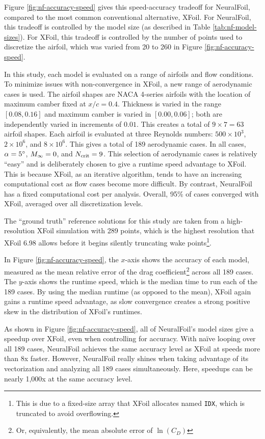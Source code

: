 Figure \ref{fig:nf-accuracy-speed} gives this speed-accuracy tradeoff for NeuralFoil, compared to the most common conventional alternative, XFoil. For NeuralFoil, this tradeoff is controlled by the model size (as described in Table \ref{tab:nf-model-sizes}). For XFoil, this tradeoff is controlled by the number of points used to discretize the airfoil, which was varied from 20 to 260 in Figure \ref{fig:nf-accuracy-speed}.

In this study, each model is evaluated on a range of airfoils and flow conditions. To minimize issues with non-convergence in XFoil, a new range of aerodynamic cases is used. The airfoil shapes are NACA 4-series airfoils with the location of maximum camber fixed at $x/c=0.4$. Thickness is varied in the range $[0.08, 0.16]$ and maximum camber is varied in $[0.00, 0.06]$; both are independently varied in increments of $0.01$. This creates a total of $9\times7=63$ airfoil shapes. Each airfoil is evaluated at three Reynolds numbers: $500\times10^3$, $2\times10^6$, and $8\times10^6$. This gives a total of 189 aerodynamic cases. In all cases, $\alpha=5\degree$, $M_\infty=0$, and $N_{\rm crit}=9$. This selection of aerodynamic cases is relatively ``easy'' and is deliberately chosen to give a runtime speed advantage to XFoil. This is because XFoil, as an iterative algorithm, tends to have an increasing computational cost as flow cases become more difficult. By contrast, NeuralFoil has a fixed computational cost per analysis. Overall, 95\% of cases converged with XFoil, averaged over all discretization levels.

The ``ground truth'' reference solutions for this study are taken from a high-resolution XFoil simulation with 289 points, which is the highest resolution that XFoil 6.98 allows before it begins silently truncating wake points\footnote{This is due to a fixed-size array that XFoil allocates named \texttt{IDX}, which is truncated to avoid overflowing.}.

In Figure \ref{fig:nf-accuracy-speed}, the $x$-axis shows the accuracy of each model, measured as the mean relative error of the drag coefficient\footnote{Or, equivalently, the mean absolute error of $\ln(C_D)$} across all 189 cases. The $y$-axis shows the runtime speed, which is the median time to run each of the 189 cases. By using the median runtime (as opposed to the mean), XFoil again gains a runtime speed advantage, as slow convergence creates a strong positive skew in the distribution of XFoil's runtimes.

As shown in Figure \ref{fig:nf-accuracy-speed}, all of NeuralFoil's model sizes give a speedup over XFoil, even when controlling for accuracy. With naïve looping over all 189 cases, NeuralFoil achieves the same accuracy level as XFoil at speeds more than 8x faster. However, NeuralFoil really shines when taking advantage of its vectorization and analyzing all 189 cases simultaneously. Here, speedups can be nearly 1,000x at the same accuracy level.

